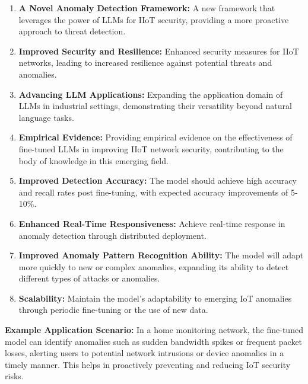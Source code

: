 \documentclass[12pt]{article}
\begin{document}
\begin{enumerate}[label=\arabic*.]
  \item \textbf{A Novel Anomaly Detection Framework:} A new framework that leverages the power of LLMs for IIoT security, providing a more proactive approach to threat detection.

  \item \textbf{Improved Security and Resilience:} Enhanced security measures for IIoT networks, leading to increased resilience against potential threats and anomalies.

  \item \textbf{Advancing LLM Applications:} Expanding the application domain of LLMs in industrial settings, demonstrating their versatility beyond natural language tasks.

  \item \textbf{Empirical Evidence:} Providing empirical evidence on the effectiveness of fine-tuned LLMs in improving IIoT network security, contributing to the body of knowledge in this emerging field.
  
  \item \textbf{Improved Detection Accuracy:} The model should achieve high accuracy and recall rates post fine-tuning, with expected accuracy improvements of 5-10\%.
  
  \item \textbf{Enhanced Real-Time Responsiveness:} Achieve real-time response in anomaly detection through distributed deployment.
  
  \item \textbf{Improved Anomaly Pattern Recognition Ability:} The model will adapt more quickly to new or complex anomalies, expanding its ability to detect different types of attacks or anomalies.
  
  \item \textbf{Scalability:} Maintain the model's adaptability to emerging IoT anomalies through periodic fine-tuning or the use of new data.
\end{enumerate}

\textbf{Example Application Scenario:} In a home monitoring network, the fine-tuned model can identify anomalies such as sudden bandwidth spikes or frequent packet losses, alerting users to potential network intrusions or device anomalies in a timely manner. This helps in proactively preventing and reducing IoT security risks.

\end{document}
